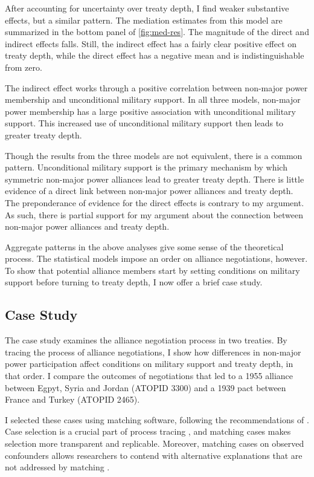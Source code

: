 \documentclass[12pt]{article}
\begin{document}
After accounting for uncertainty over treaty depth, I find weaker substantive effects, but a similar pattern. 
The mediation estimates from this model are summarized in the bottom panel of \autoref{fig:med-res}. 
The magnitude of the direct and indirect effects falls. 
Still, the indirect effect has a fairly clear positive effect on treaty depth, while the direct effect has a negative mean and is indistinguishable from zero. 


The indirect effect works through a positive correlation between non-major power membership and unconditional military support. 
In all three models, non-major power membership has a large positive association with unconditional military support. 
This increased use of unconditional military support then leads to greater treaty depth. 


Though the results from the three models are not equivalent, there is a common pattern. 
Unconditional military support is the primary mechanism by which symmetric non-major power alliances lead to greater treaty depth. 
There is little evidence of a direct link between non-major power alliances and treaty depth. 
The preponderance of evidence for the direct effects is contrary to my argument. 
As such, there is partial support for my argument about the connection between non-major power alliances and treaty depth. 


Aggregate patterns in the above analyses give some sense of the theoretical process. 
The statistical models impose an order on alliance negotiations, however. 
To show that potential alliance members start by setting conditions on military support before turning to treaty depth, I now offer a brief case study. 


\subsection{Case Study}

The case study examines the alliance negotiation process in two treaties. 
By tracing the process of alliance negotiations, I show how differences in non-major power participation affect conditions on military support and treaty depth, in that order. 
I compare the outcomes of negotiations that led to a 1955 alliance between Egpyt, Syria and Jordan (ATOPID 3300) and a 1939 pact between France and Turkey (ATOPID 2465). 


I selected these cases using matching software, following the recommendations of \citet{Nielsen2016}. 
Case selection is a crucial part of process tracing \citep{SeawrightGerring2008}, and matching cases makes selection more transparent and replicable. 
Moreover, matching cases on observed confounders allows researchers to contend with alternative explanations that are not addressed by matching \citep{Nielsen2016}. 
\end{document}
